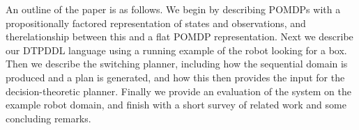 
An outline of the paper is as follows. We begin by describing POMDPs with a
propositionally factored representation of states and observations,
and therelationship between this and a flat POMDP representation. Next
we describe our DTPDDL language using a running example of the robot
looking for a box. Then we describe the switching planner, including
how the sequential domain is produced and a plan is generated, and how
this then provides the input for the decision-theoretic
planner. Finally we provide an evaluation of the system on the example
robot domain, and finish with a short survey of related work and some
concluding remarks.
